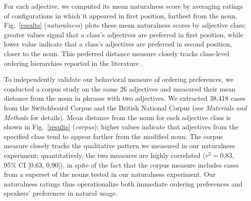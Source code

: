 \documentclass{pnastwo}
\begin{document}
\begin{article}
For each adjective, we computed its mean naturalness score by averaging ratings of configurations in which it appeared in first position, farthest from the noun. Fig.\ \ref{results} (\emph{naturalness}) plots these mean naturalness scores by adjective class; greater values signal that a class's adjectives are preferred in first position, while lower value indicate that a class's adjectives are preferred in second position, closer to the noun. This preferred distance measure closely tracks class-level ordering hierarchies reported in the literature \cite{dixon1982,sproatshih1991}.

To independently validate our behavioral measure of ordering preferences, we conducted a corpus study on the same 26 adjectives and measured their mean distance from the noun in phrases with two adjectives. We extracted 38,418 cases from the Switchboard Corpus and the British National Corpus (see \emph{Materials and Methods} for details). Mean distance from the noun for each adjective class is shown in Fig.~\ref{results} (\emph{corpus}); higher values indicate that adjectives from the specified class tend to appear farther from the modified noun. The corpus measure closely tracks the qualitative pattern we measured in our naturalness experiment; quantitatively, the two measures are highly correlated ($r^{2}=0.83$, 95\% CI [0.63, 0.90]), in spite of the fact that the corpus measure includes cases from a superset of the nouns tested in our naturalness experiment. Our naturalness ratings thus operationalize both immediate ordering preferences and speakers' preferences in natural usage.


\end{article}
\end{document}
